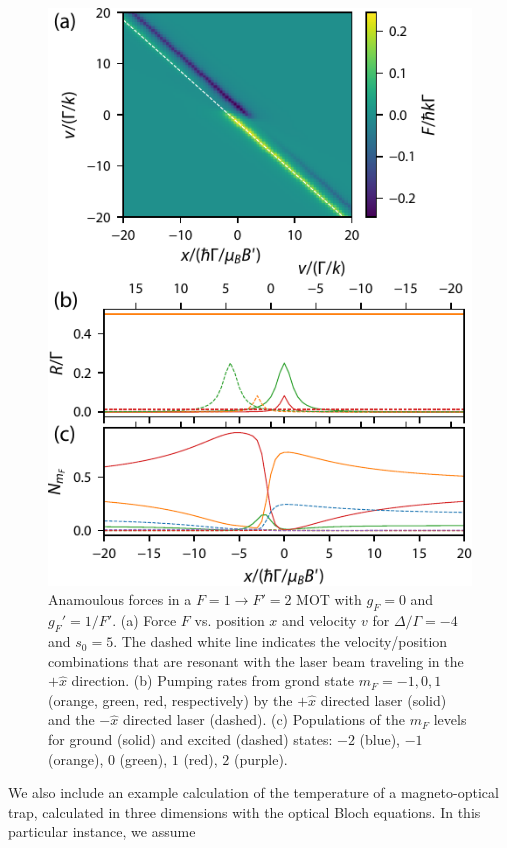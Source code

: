 \documentclass[final,5p,times,twocolumn]{elsarticle}
\begin{document}
\begin{figure}
	\center
	\includegraphics{figs/F1_to_F2_MOT_merged}
	\caption{\label{fig:mot_F1_to_F2} Anamoulous forces in a $F=1\rightarrow F'=2$ MOT with $g_F=0$ and $g_F'=1/F'$.  (a) Force $F$ vs. position $x$ and velocity $v$ for $\Delta/\Gamma=-4$ and $s_0=5$.  The dashed white line indicates the velocity/position combinations that are resonant with the laser beam traveling in the $+\hat{x}$ direction.  (b) Pumping rates from grond state $m_F=-1, 0, 1$ (orange, green, red, respectively) by the $+\hat{x}$ directed laser (solid) and the $-\hat{x}$ directed laser (dashed).  (c) Populations of the $m_F$ levels for ground (solid) and excited (dashed) states: $-2$ (blue), $-1$ (orange), $0$ (green), $1$ (red), $2$ (purple).}
\end{figure}

We also include an example calculation of the temperature of a magneto-optical trap, calculated in three dimensions with the optical Bloch equations.  In this particular instance, we assume 
\end{document}
